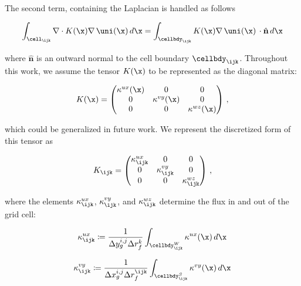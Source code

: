 \documentclass[alpha-refs]{wiley-article}
\begin{document}
The second term, containing the Laplacian is handled as follows
\begin{linenomath*}\begin{equation*}
    \int_{\cell_\ijk} \nabla\cdot K(\x)\nabla\,\uni(\x)\,d\x
    =\int_{\cellbdy_\ijk} K(\x)\nabla\,\uni(\x)\,
    \cdot \hat{\mathbf{n}} \, d\x
\end{equation*}\end{linenomath*}
where $\hat{\mathbf{n}}$ is an outward normal to the cell boundary
$\cellbdy_\ijk$.
Throughout this work, we assume the tensor $K(\x)$ to be represented as the
diagonal matrix:
\begin{linenomath*}\begin{equation*}
    K(\x) =
    \begin{pmatrix}
        \kappa^{ux}(\x) & 0 & 0 \\
        0 &\kappa^{vy}(\x) & 0 \\
        0 & 0 & \kappa^{wz}(\x) \\
    \end{pmatrix} \, ,
\end{equation*}\end{linenomath*}
which could be generalized in future work.
We represent the discretized form of this tensor as
\begin{linenomath*}\begin{equation*}
    K_\ijk =
    \begin{pmatrix}
        \kappa^{ux}_\ijk & 0 & 0 \\
        0 & \kappa^{vy}_\ijk & 0 \\
        0 & 0 & \kappa^{wz}_\ijk \\
    \end{pmatrix} \, ,
\end{equation*}\end{linenomath*}
where the elements $\kappa^{ux}_\ijk$, $\kappa^{vy}_\ijk$, and $\kappa^{wz}_\ijk$
determine the flux in and out of the grid cell:
\begin{linenomath*}\begin{equation*}
    \kappa^{ux}_{\ijk} \coloneqq \dfrac{1}{\Delta y_g^{i,j}\Delta r_f^{k}}
    \int_{\cellbdy_{\ijk}^{W}} \kappa^{ux}(\x)\,d\x
\end{equation*}\end{linenomath*}
\begin{linenomath*}\begin{equation*}
    \kappa^{vy}_{\ijk} \coloneqq \dfrac{1}{\Delta x_g^{i,j}\Delta r_f^{\ijk}}
    \int_{\cellbdy_{\ijk}^{S}} \kappa^{vy}(\x)\,d\x
\end{equation*}\end{linenomath*}
\end{document}
